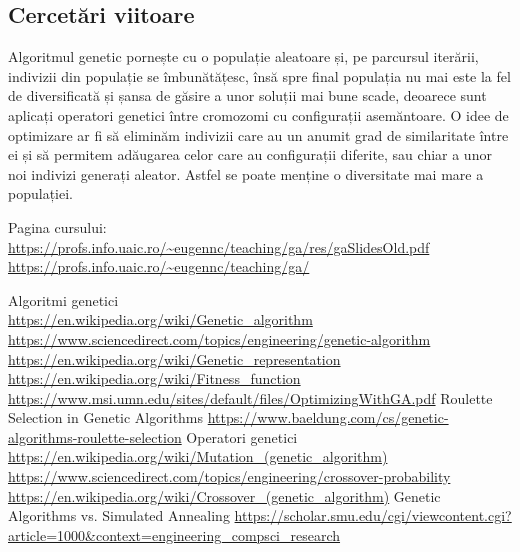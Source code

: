 \documentclass{article}
\begin{document}
\subsection{Cercetări viitoare}
Algoritmul genetic pornește cu o populație aleatoare și, pe parcursul iterării, indivizii din populație se îmbunătățesc, însă spre final populația nu mai este la fel de diversificată și șansa de găsire a unor soluții mai bune scade, deoarece sunt aplicați operatori genetici între cromozomi cu configurații asemăntoare. O idee de optimizare ar fi să eliminăm indivizii care au un anumit grad de similaritate între ei și să permitem adăugarea celor care au configurații diferite, sau chiar a unor noi indivizi generați aleator. Astfel se poate menține o diversitate mai mare a populației.



\begin{thebibliography}{20}

\bibitem{}
  Pagina cursului:
  \\
  \url{https://profs.info.uaic.ro/~eugennc/teaching/ga/res/gaSlidesOld.pdf}\\
  \url{https://profs.info.uaic.ro/~eugennc/teaching/ga/}

\bibitem{}
  Algoritmi genetici
  \\
  \url{https://en.wikipedia.org/wiki/Genetic_algorithm}
  \\
  \url{https://www.sciencedirect.com/topics/engineering/genetic-algorithm}
  \\
  \url{https://en.wikipedia.org/wiki/Genetic_representation}
  \\
  \url{https://en.wikipedia.org/wiki/Fitness_function}
  \\
  \url{https://www.msi.umn.edu/sites/default/files/OptimizingWithGA.pdf}
\bibitem{}  
  Roulette Selection in Genetic Algorithms
  \url{https://www.baeldung.com/cs/genetic-algorithms-roulette-selection}
\bibitem{} 
  Operatori genetici
  \\
  \url{https://en.wikipedia.org/wiki/Mutation_(genetic_algorithm)}
  \\
  \url{https://www.sciencedirect.com/topics/engineering/crossover-probability}
  \\
  \url{https://en.wikipedia.org/wiki/Crossover_(genetic_algorithm)}
\bibitem{}
Genetic Algorithms vs. Simulated Annealing
  \url{https://scholar.smu.edu/cgi/viewcontent.cgi?article=1000&context=engineering_compsci_research}

	
	
\end{thebibliography}  
\end{document}
